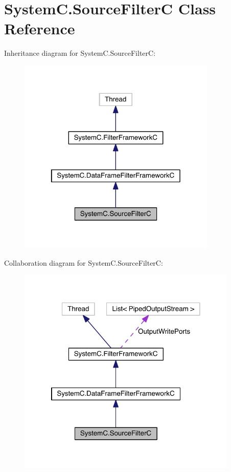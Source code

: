 \hypertarget{class_system_c_1_1_source_filter_c}{}\section{System\+C.\+Source\+Filter\+C Class Reference}
\label{class_system_c_1_1_source_filter_c}


Inheritance diagram for System\+C.\+Source\+Filter\+C\+:\nopagebreak
\begin{figure}[H]
\begin{center}
\leavevmode
\includegraphics[width=268pt]{class_system_c_1_1_source_filter_c__inherit__graph}
\end{center}
\end{figure}


Collaboration diagram for System\+C.\+Source\+Filter\+C\+:\nopagebreak
\begin{figure}[H]
\begin{center}
\leavevmode
\includegraphics[width=297pt]{class_system_c_1_1_source_filter_c__coll__graph}
\end{center}
\end{figure}
